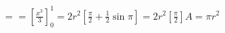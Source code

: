 \documentclass[preview]{standalone}
\begin{document}
\begin{align*}
== \left[\frac{x^3}{3}\right]_0^1 =2r^{2}\left[\frac{\pi}{2}+\frac{1}{2}\sin\pi\right] =2r^{2}\left[\frac{\pi}{2}\right] A=\pi r^{2}
\end{align*}
\end{document}
